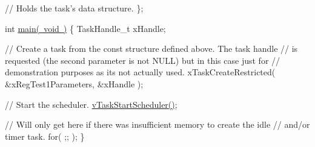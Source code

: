 \begin{DoxyPre}     // Holds the task's data structure.
\};\end{DoxyPre}



\begin{DoxyPre}int \mbox{\hyperlink{mian_8c_a840291bc02cba5474a4cb46a9b9566fe}{main( void )}}
\{
TaskHandle\_t xHandle;\end{DoxyPre}



\begin{DoxyPre}    // Create a task from the const structure defined above.  The task handle
    // is requested (the second parameter is not NULL) but in this case just for
    // demonstration purposes as its not actually used.
    xTaskCreateRestricted( \&xRegTest1Parameters, \&xHandle );\end{DoxyPre}



\begin{DoxyPre}    // Start the scheduler.
    \mbox{\hyperlink{task_8h_aaf9dca1065c60abdeb309d56ab7293cb}{vTaskStartScheduler()}};\end{DoxyPre}



\begin{DoxyPre}    // Will only get here if there was insufficient memory to create the idle
    // and/or timer task.
    for( ;; );
\}
   \end{DoxyPre}
 
